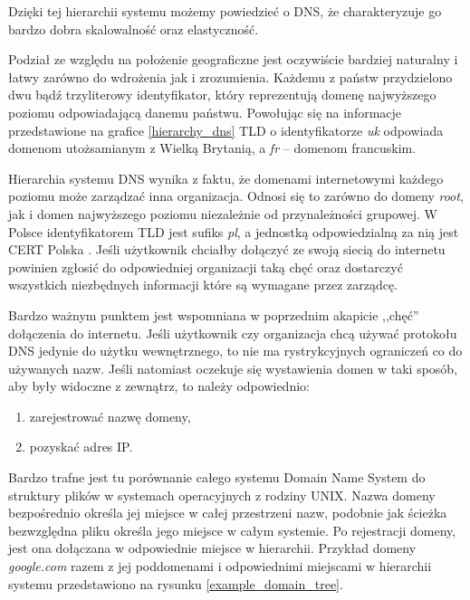 Dzięki tej hierarchii systemu możemy powiedzieć o DNS, że charakteryzuje go bardzo dobra skalowalność oraz elastyczność.

Podział ze względu na położenie geograficzne jest oczywiście bardziej naturalny i łatwy zarówno do wdrożenia jak i zrozumienia.
Każdemu z państw przydzielono dwu bądź trzyliterowy identyfikator, który reprezentują domenę najwyższego poziomu odpowiadającą
danemu państwu. Powołując się na informacje przedstawione na grafice \ref{hierarchy_dns} TLD o identyfikatorze \textit{uk}
odpowiada domenom utożsamianym z Wielką Brytanią, a \textit{fr} -- domenom francuskim.

Hierarchia systemu DNS wynika z faktu, że domenami internetowymi każdego poziomu może zarządzać inna organizacja. Odnosi się to
zarówno do domeny \textit{root}, jak i domen najwyższego poziomu niezależnie od przynależności grupowej. W Polsce identyfikatorem
TLD jest sufiks \textit{pl}, a jednostką odpowiedzialną za nią jest CERT Polska \cite{cert}. Jeśli użytkownik chciałby dołączyć
ze swoją siecią do internetu powinien zgłosić do odpowiedniej organizacji taką chęć oraz dostarczyć wszystkich niezbędnych
informacji które są wymagane przez zarządcę.

Bardzo ważnym punktem jest wspomniana w poprzednim akapicie ,,chęć'' dołączenia do internetu. Jeśli użytkownik czy organizacja
chcą używać protokołu DNS jedynie do użytku wewnętrznego, to nie ma rystrykcyjnych ograniczeń co do używanych nazw. Jeśli natomiast
oczekuje się wystawienia domen w taki sposób, aby były widoczne z zewnątrz, to należy odpowiednio:
\begin{enumerate}
	\item zarejestrować nazwę domeny,
	\item pozyskać adres IP.
\end{enumerate}

Bardzo trafne jest tu porównanie całego systemu Domain Name System do struktury plików w systemach operacyjnych z rodziny UNIX.
Nazwa domeny bezpośrednio określa jej miejsce w całej przestrzeni nazw, podobnie jak ścieżka bezwzględna pliku określa jego miejsce
w całym systemie. Po rejestracji domeny, jest ona dołączana w odpowiednie miejsce w hierarchii. Przykład domeny \textit{google.com}
razem z jej poddomenami i odpowiednimi miejscami w hierarchii systemu przedstawiono na rysunku \ref{example_domain_tree}.


